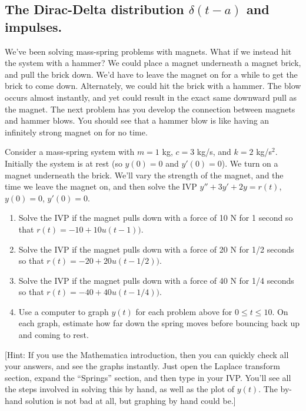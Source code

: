\subsection{The Dirac-Delta distribution $\delta(t-a)$ and impulses. }

We've been solving mass-spring problems with magnets. What if we instead hit the system with a hammer?  
We could place a magnet underneath a magnet brick, and pull the brick down. We'd have to leave the magnet on for a while to get the brick to come down. 
Alternately, we could hit the brick with a hammer.  The blow occurs almost instantly, and yet could result in the exact same downward pull as the magnet.
The next problem has you develop the connection between magnets and hammer blows. You should see that a hammer blow is like having an infinitely strong magnet on for no time.   

\begin{problem}
 Consider a mass-spring system with $m=1$ kg, $c=3$ kg/s, and $k=2$ kg/s$^2$.  Initially the system is at rest (so $y(0)=0$ and $y'(0)=0$). We turn on a magnet underneath the brick. We'll vary the strength of the magnet, and the time we leave the magnet on, and then solve the IVP $y''+3y'+2y=r(t)$, $y(0)=0$, $y'(0)=0$. 
\begin{enumerate}
 \item{}%
 Solve the IVP if the magnet pulls down with a force of 10 N for 1 second so that $r(t)=-10+10u(t-1))$.
 \item Solve the IVP if the magnet pulls down with a force of 20 N for 1/2 seconds so that $r(t)=-20+20u(t-1/2))$.
 \item Solve the IVP if the magnet pulls down with a force of 40 N for 1/4 seconds so that $r(t)=-40+40u(t-1/4))$.
 \item Use a computer to graph $y(t)$ for each problem above for $0\leq t\leq 10$.  On each graph, estimate how far down the spring moves before bouncing back up and coming to rest. 
\end{enumerate}
[Hint: If you use the Mathematica introduction, then you can quickly check all your answers, and see the graphs instantly.  Just open the Laplace transform section, expand the ``Springs'' section, and then type in your IVP. You'll see all the steps involved in solving this by hand, as well as the plot of $y(t)$. The by-hand solution is not bad at all, but graphing by hand could be.]
\end{problem}


